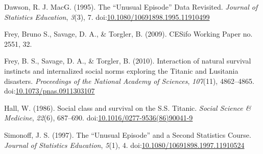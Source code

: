 \documentclass[]{article}
\begin{document}
\noindent

\hypertarget{refs}{}
\begin{CSLReferences}{1}{0}
\leavevmode\hypertarget{ref-dawson_unusual_1995}{}%
Dawson, R. J. MacG. (1995). The {``{Unusual} {Episode}''} {Data}
{Revisited}. \emph{Journal of Statistics Education}, \emph{3}(3), 7.
doi:\href{https://doi.org/10.1080/10691898.1995.11910499}{10.1080/10691898.1995.11910499}

\leavevmode\hypertarget{ref-frey_cesifo_2009}{}%
Frey, Bruno S., Savage, D. A., \& Torgler, B. (2009). {CESifo} {Working}
{Paper} no. 2551, 32.

\leavevmode\hypertarget{ref-frey_interaction_2010}{}%
Frey, B. S., Savage, D. A., \& Torgler, B. (2010). Interaction of
natural survival instincts and internalized social norms exploring the
{Titanic} and {Lusitania} disasters. \emph{Proceedings of the National
Academy of Sciences}, \emph{107}(11), 4862--4865.
doi:\href{https://doi.org/10.1073/pnas.0911303107}{10.1073/pnas.0911303107}

\leavevmode\hypertarget{ref-hall_social_1986}{}%
Hall, W. (1986). Social class and survival on the {S}.{S}. {Titanic}.
\emph{Social Science \& Medicine}, \emph{22}(6), 687--690.
doi:\href{https://doi.org/10.1016/0277-9536(86)90041-9}{10.1016/0277-9536(86)90041-9}

\leavevmode\hypertarget{ref-simonoff_unusual_1997}{}%
Simonoff, J. S. (1997). The {``{Unusual} {Episode}''} and a {Second}
{Statistics} {Course}. \emph{Journal of Statistics Education},
\emph{5}(1), 4.
doi:\href{https://doi.org/10.1080/10691898.1997.11910524}{10.1080/10691898.1997.11910524}

\end{CSLReferences}
\end{document}
